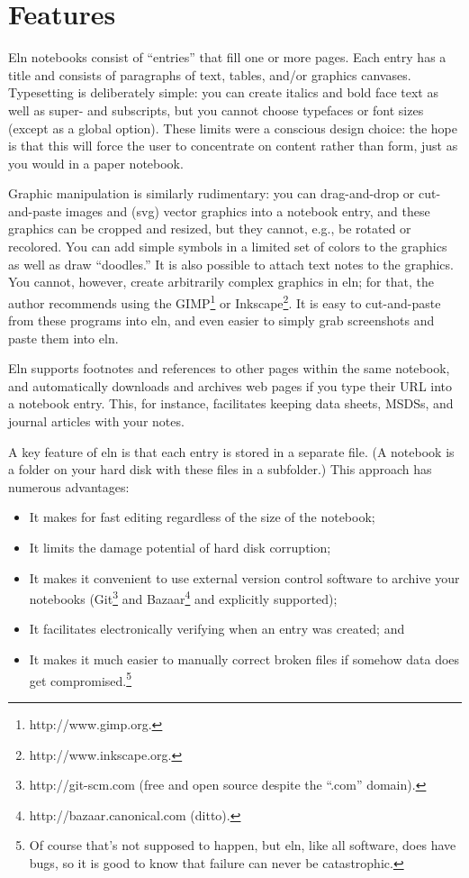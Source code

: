 \documentclass[11pt]{report}
\begin{document}
\section{Features}

Eln notebooks consist of ``entries'' that fill one or more pages.
Each entry has a title and consists of paragraphs of text, tables, and/or
graphics canvases. Typesetting is deliberately simple: you can create italics
and bold face text as well as super- and subscripts, but you cannot
choose typefaces or font sizes (except as a global option). These
limits were a conscious design choice: the hope is that this will
force the user to concentrate on content rather than form, just as you
would in a paper notebook.

Graphic manipulation is similarly rudimentary: you can drag-and-drop
or cut-and-paste images and (svg) vector graphics into a notebook
entry, and these graphics can be cropped and resized, but they cannot,
e.g., be rotated or recolored. You can add simple symbols in a limited
set of colors to the graphics as well as draw ``doodles.'' It is also
possible to attach text notes to the graphics. You cannot, however,
create arbitrarily complex graphics in eln; for that, the author
recommends using the GIMP\footnote{http://www.gimp.org.} or
Inkscape\footnote{http://www.inkscape.org.}. It is easy to
cut-and-paste from these programs into eln, and even easier to simply
grab screenshots and paste them into eln.

Eln supports footnotes and references to other pages within the same
notebook, and automatically downloads and archives web pages if you
type their URL into a notebook entry. This, for instance, facilitates
keeping data sheets, MSDSs, and journal articles with your notes.

A key feature of eln is that each entry is stored in a separate
file. (A notebook is a folder on your hard disk with these files in a
subfolder.) This approach has numerous advantages:
\begin{itemize}
  \item It makes for fast
editing regardless of the size of the notebook;
\item It limits the damage
potential of hard disk corruption;
\item It makes it convenient to use
external version control software to archive your notebooks
(Git\footnote{http://git-scm.com (free and open source despite the
  ``.com'' domain).} and Bazaar\footnote{http://bazaar.canonical.com (ditto).} and
explicitly supported);
\item It facilitates electronically verifying when an
entry was created; and
\item It makes it much easier to manually correct
broken files if somehow data does get compromised.\footnote{Of course
  that's not supposed to happen, but eln, like all software, does have
  bugs, so it is good to know that failure can never be catastrophic.}
\end{itemize}
\end{document}
